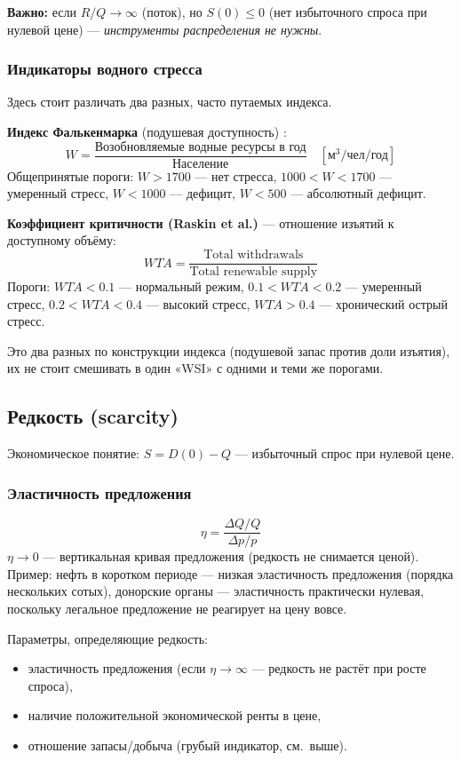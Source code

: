 \documentclass[11pt]{article}
\begin{document}
\textbf{Важно:} если $R/Q \to \infty$ (поток), но $S(0) \le 0$ (нет избыточного спроса при нулевой цене) — \emph{инструменты распределения не нужны}.

\subsubsection{Индикаторы водного стресса}
Здесь стоит различать два разных, часто путаемых индекса.

\textbf{Индекс Фалькенмарка} (подушевая доступность) \cite{falkenmark1989}:
\[
W = \frac{\text{Возобновляемые водные ресурсы в год}}{\text{Население}}\quad [\text{м}^3/\text{чел}/\text{год}]
\]
Общепринятые пороги: $W>1700$ — нет стресса, $1000<W<1700$ — умеренный стресс, $W<1000$ — дефицит, $W<500$ — абсолютный дефицит.

\textbf{Коэффициент критичности (Raskin et al.)} \cite{raskin1997watersupply} — отношение изъятий к доступному объёму:
\[
WTA = \frac{\text{Total withdrawals}}{\text{Total renewable supply}}
\]
Пороги: $WTA<0.1$ — нормальный режим, $0.1<WTA<0.2$ — умеренный стресс, $0.2<WTA<0.4$ — высокий стресс, $WTA>0.4$ — хронический острый стресс.

Это два разных по конструкции индекса (подушевой запас против доли изъятия), их не стоит смешивать в один «WSI» с одними и теми же порогами.

\subsection{Редкость (scarcity)}
Экономическое понятие: $S = D(0) - Q$ — избыточный спрос при нулевой цене.

\subsubsection{Эластичность предложения}
\[
\eta = \frac{\Delta Q/Q}{\Delta p/p}
\]
$\eta \to 0$ — вертикальная кривая предложения (редкость не снимается ценой). Пример: нефть в коротком периоде — низкая эластичность предложения (порядка нескольких сотых), донорские органы — эластичность практически нулевая, поскольку легальное предложение не реагирует на цену вовсе.

Параметры, определяющие редкость:
\begin{itemize}
\item эластичность предложения (если $\eta \to \infty$ — редкость не растёт при росте спроса),
\item наличие положительной экономической ренты в цене,
\item отношение запасы/добыча (грубый индикатор, см.\ выше).
\end{itemize}
\end{document}
